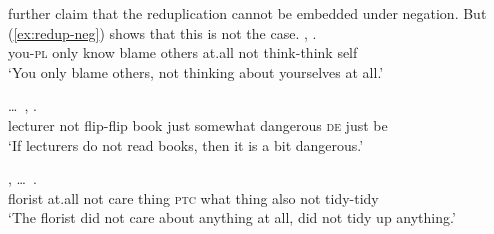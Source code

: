 \citet[319]{SuiHu2016} further claim that the reduplication cannot be embedded under negation. 
But (\ref{ex:redup-neg}) shows that this is not the case.
\ea \label{ex:redup-neg}
\ea\label{ex:neg1}
\gll {}    ,    .\\
you-\textsc{pl} only know blame others at.all not think-think self\\ 
\glt `You only blame others, not thinking about yourselves at all.'



\ex\label{ex:neg2}
\gll {} \ldots\,   ,      .\\
lecturer {} not flip-flip book just somewhat dangerous \textsc{de} just be\\ 
\glt `If lecturers do not read books, then it is a bit dangerous.'

\ex\label{ex:neg3}
\gll {}     , \ldots\,     .\\
florist at.all not care thing \textsc{ptc} {} what thing also not tidy-tidy\\ 
\glt `The florist did not care about anything at all, did not tidy up anything.'

